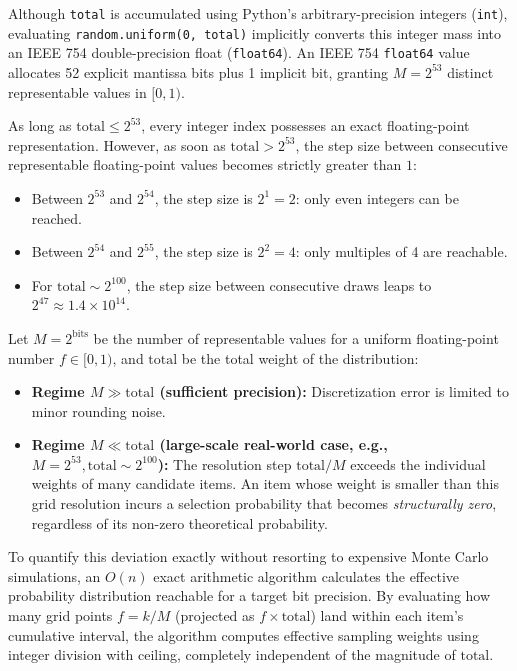 
Although \texttt{total} is accumulated using Python's arbitrary-precision integers (\texttt{int}), evaluating \texttt{random.uniform(0, total)} implicitly converts this integer mass into an IEEE 754 double-precision float (\texttt{float64}). An IEEE 754 \texttt{float64} value allocates 52 explicit mantissa bits plus 1 implicit bit, granting $M = 2^{53}$ distinct representable values in $[0, 1)$.

As long as $\text{total} \le 2^{53}$, every integer index possesses an exact floating-point representation. However, as soon as $\text{total} > 2^{53}$, the step size between consecutive representable floating-point values becomes strictly greater than $1$:
\begin{itemize}
    \item Between $2^{53}$ and $2^{54}$, the step size is $2^1 = 2$: only even integers can be reached.
    \item Between $2^{54}$ and $2^{55}$, the step size is $2^2 = 4$: only multiples of 4 are reachable.
    \item For $\text{total} \sim 2^{100}$, the step size between consecutive draws leaps to $2^{47} \approx 1.4 \times 10^{14}$.
\end{itemize}

Let $M = 2^{\text{bits}}$ be the number of representable values for a uniform floating-point number $f \in [0, 1)$, and $\text{total}$ be the total weight of the distribution:
\begin{itemize}
    \item \textbf{Regime $M \gg \text{total}$ (sufficient precision):} Discretization error is limited to minor rounding noise.
    \item \textbf{Regime $M \ll \text{total}$ (large-scale real-world case, e.g., $M = 2^{53}, \text{total} \sim 2^{100}$):} The resolution step $\text{total}/M$ exceeds the individual weights of many candidate items. An item whose weight is smaller than this grid resolution incurs a selection probability that becomes \emph{structurally zero}, regardless of its non-zero theoretical probability.
\end{itemize}

To quantify this deviation exactly without resorting to expensive Monte Carlo simulations, an $O(n)$ exact arithmetic algorithm calculates the effective probability distribution reachable for a target bit precision. By evaluating how many grid points $f = k/M$ (projected as $f \times \text{total}$) land within each item's cumulative interval, the algorithm computes effective sampling weights using integer division with ceiling, completely independent of the magnitude of $\text{total}$.

